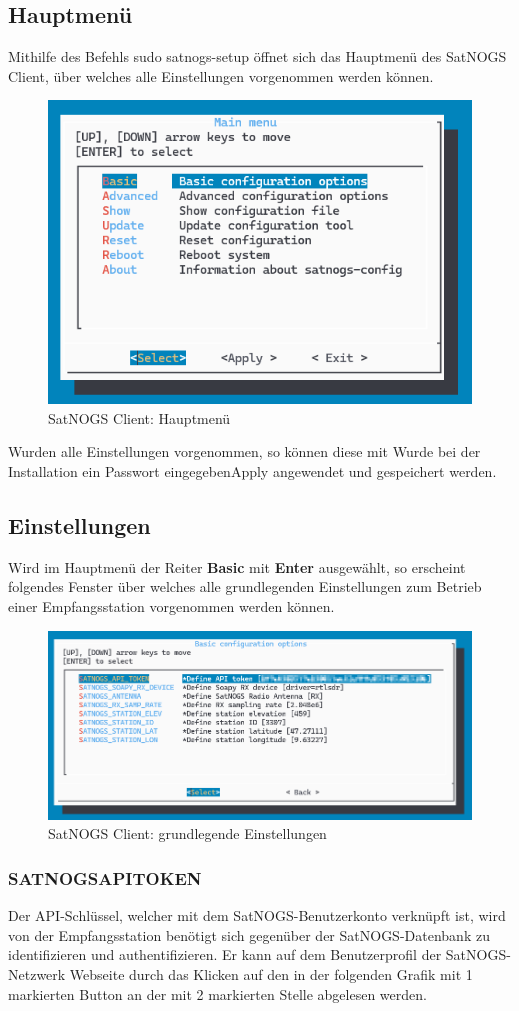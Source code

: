 \subsection{Hauptmenü}
Mithilfe des Befehls \glqq sudo satnogs-setup\grqq{} öffnet sich das Hauptmenü des SatNOGS Client, über welches alle Einstellungen vorgenommen werden können.

\begin{figure} [H]
	\centering
	\includegraphics[width=.5\linewidth]{../ref/mainmenu.png}
	\caption{SatNOGS Client: Hauptmenü}
	\label{fig:mainmenu}
\end{figure}

Wurden alle Einstellungen vorgenommen, so können diese mit Wurde bei der Installation ein Passwort eingegeben\glqq Apply\grqq{} angewendet und gespeichert werden.

\subsection{Einstellungen}
Wird im Hauptmenü der Reiter \textbf{Basic} mit \textbf{Enter} ausgewählt, so erscheint folgendes Fenster über welches alle grundlegenden Einstellungen zum Betrieb einer Empfangsstation vorgenommen werden können.

\begin{figure} [H]
	\centering
	\includegraphics[width=.75\linewidth]{../ref/basic_configurations.png}
	\caption{SatNOGS Client: grundlegende Einstellungen}
	\label{fig:basic_configurations}
\end{figure}

\subsubsection{SATNOGS\textunderscore API\textunderscore TOKEN}
Der API-Schlüssel, welcher mit dem SatNOGS-Benutzerkonto verknüpft ist, wird von der Empfangsstation benötigt sich gegenüber der SatNOGS-Datenbank zu identifizieren und authentifizieren. Er kann auf dem Benutzerprofil der SatNOGS-Netzwerk Webseite durch das Klicken auf den in der folgenden Grafik mit 1 markierten Button an der mit 2 markierten Stelle abgelesen werden.

